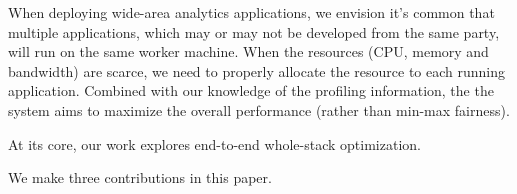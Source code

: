 When deploying wide-area analytics applications, we envision it's common that
multiple applications, which may or may not be developed from the same party,
will run on the same worker machine. When the resources (CPU, memory and
bandwidth) are scarce, we need to properly allocate the resource to each running
application. Combined with our knowledge of the profiling information, the the
system aims to maximize the overall performance (rather than min-max fairness).

At its core, our work explores end-to-end whole-stack optimization.

We make three contributions in this paper.

